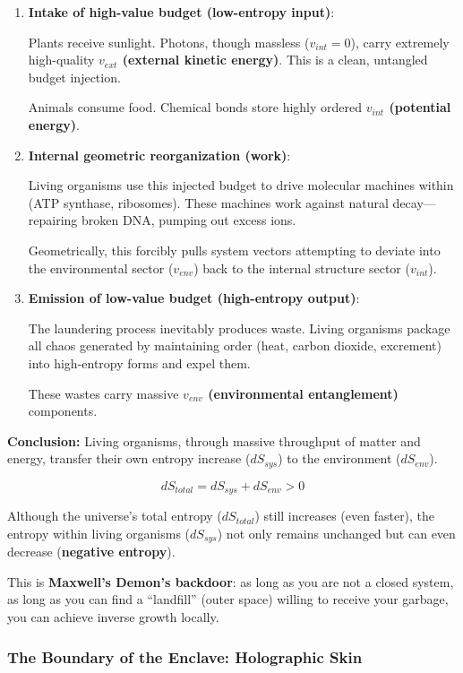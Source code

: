 \begin{enumerate}
\item \textbf{Intake of high-value budget (low-entropy input)}:

    Plants receive sunlight. Photons, though massless ($v_{int}=0$), carry extremely high-quality \textbf{$v_{ext}$ (external kinetic energy)}. This is a clean, untangled budget injection.

    Animals consume food. Chemical bonds store highly ordered \textbf{$v_{int}$ (potential energy)}.

\item \textbf{Internal geometric reorganization (work)}:

    Living organisms use this injected budget to drive molecular machines within (ATP synthase, ribosomes). These machines work against natural decay---repairing broken DNA, pumping out excess ions.

    Geometrically, this forcibly pulls system vectors attempting to deviate into the environmental sector ($v_{env}$) back to the internal structure sector ($v_{int}$).

\item \textbf{Emission of low-value budget (high-entropy output)}:

    The laundering process inevitably produces waste. Living organisms package all chaos generated by maintaining order (heat, carbon dioxide, excrement) into high-entropy forms and expel them.

    These wastes carry massive \textbf{$v_{env}$ (environmental entanglement)} components.
\end{enumerate}

\textbf{Conclusion:} Living organisms, through massive throughput of matter and energy, transfer their own entropy increase ($dS_{sys}$) to the environment ($dS_{env}$).

\[dS_{total} = dS_{sys} + dS_{env} > 0\]

Although the universe's total entropy ($dS_{total}$) still increases (even faster), the entropy within living organisms ($dS_{sys}$) not only remains unchanged but can even decrease (\textbf{negative entropy}).

This is \textbf{Maxwell's Demon's backdoor}: as long as you are not a closed system, as long as you can find a ``landfill'' (outer space) willing to receive your garbage, you can achieve inverse growth locally.

\subsubsection{The Boundary of the Enclave: Holographic Skin}


